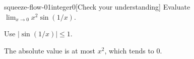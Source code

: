 \begin{bgcheck}{squeeze-flow-01}{integer}{0}[Check your understanding]
Evaluate \(\lim_{x\to0}x^2\sin(1/x)\).
\begin{bghint}
Use \(|\sin(1/x)|\le1\).
\end{bghint}
\begin{bgreveal}
The absolute value is at most \(x^2\), which tends to \(0\).
\end{bgreveal}
\end{bgcheck}
